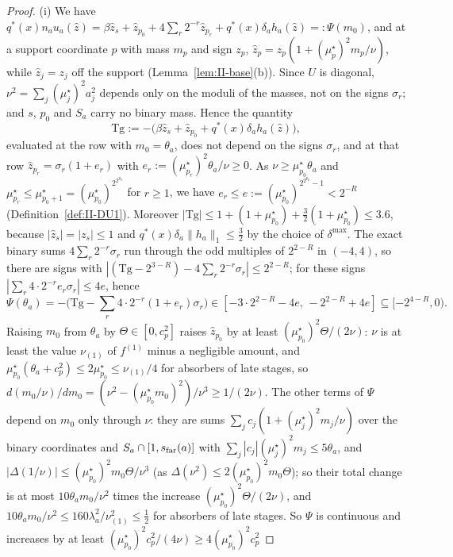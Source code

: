 \documentclass[10pt]{amsart}
\theoremstyle{definition}
\theoremstyle{remark}
\newcommand{\zh}{\hat z}
\begin{document}
\begin{proof}
(i) We have $q^*(x)n_au_a(\zh)=\beta\zh_s+\zh_{p_0}+4\sum_r2^{-r}\zh_{p_r}+q^*(x)
\delta_ah_a(\zh)=:\Psi(m_0)$, and at a support coordinate $p$ with mass $m_p$
and sign $z_p$, $\zh_p=z_p(1+(\mu^\star_p)^2m_p/\nu)$, while $\zh_j=z_j$ off the
support (Lemma~\ref{lem:II-base}(b)).  Since $U$ is diagonal, $\nu^2=\sum_j
(\mu^\star_j)^2a_j^2$ depends only on the moduli of the masses, not on the
signs $\sigma_r$; and $s$, $p_0$ and $S_a$ carry no binary mass.  Hence the
quantity
\[
 \mathrm{Tg}:=-\big(\beta\zh_s+\zh_{p_0}+q^*(x)\delta_ah_a(\zh)\big),
\]
evaluated at the row with $m_0=\theta_a$, does not depend on the signs
$\sigma_r$, and at that row $\zh_{p_r}=\sigma_r(1+e_r)$ with $e_r:=(\mu^\star_{p_r})^2
\theta_a/\nu\ge0$.  As $\nu\ge\mu^\star_{p_0}\theta_a$ and $\mu^\star_{p_r}\le
\mu^\star_{p_0+1}=(\mu^\star_{p_0})^{2^{2^{p_0}}}$ for $r\ge1$, we have $e_r\le e:=
(\mu^\star_{p_0})^{2^{2^{p_0}}-1}<2^{-R}$ (Definition~\ref{def:II-DU1}).  Moreover
$|\mathrm{Tg}|\le1+(1+\mu^\star_{p_0})+\frac32(1+\mu^\star_{p_0})\le3.6$, because
$|\zh_s|=|z_s|\le1$ and $q^*(x)\delta_a\|h_a\|_1\le\frac32$ by the choice of
$\delta^{\max}$.  The exact binary sums $4\sum_r2^{-r}\sigma_r$ run through the
odd multiples of $2^{2-R}$ in $(-4,4)$, so there are signs with $|(\mathrm{Tg}-
2^{3-R})-4\sum_r2^{-r}\sigma_r|\le2^{2-R}$; for these signs
$|\sum_r4\cdot2^{-r}e_r\sigma_r|\le4e$, hence
\[
 \Psi(\theta_a)=-\Big(\mathrm{Tg}-\sum_r4\cdot2^{-r}(1+e_r)\sigma_r\Big)\in
 [-3\cdot2^{2-R}-4e,\,-2^{2-R}+4e]\subseteq[-2^{4-R},0) .
\]
Raising $m_0$ from $\theta_a$ by $\Theta\in[0,c_p^2]$ raises $\zh_{p_0}$ by at
least $(\mu^\star_{p_0})^2\Theta/(2\nu)$: $\nu$ is at least the value $\nu_{(1)}$ of
$f^{(1)}$ minus a negligible amount, and $\mu^\star_{p_0}(\theta_a+c_p^2)\le
2\mu^\star_{p_0}\le\nu_{(1)}/4$ for absorbers of late stages, so $d(m_0/\nu)/dm_0
=(\nu^2-(\mu^\star_{p_0}m_0)^2)/\nu^3\ge1/(2\nu)$.  The other terms of $\Psi$ depend
on $m_0$ only through $\nu$: they are sums $\sum_jc_j(1+(\mu^\star_j)^2m_j/\nu)$
over the binary coordinates and $S_a\cap[1,s_{\rm far}(a)]$ with $\sum_j|c_j|
(\mu^\star_j)^2m_j\le5\theta_a$, and $|\Delta(1/\nu)|\le(\mu^\star_{p_0})^2m_0\Theta/
\nu^3$ (as $\Delta(\nu^2)\le2(\mu^\star_{p_0})^2m_0\Theta$); so their total change is
at most $10\theta_am_0/\nu^2$ times the increase $(\mu^\star_{p_0})^2\Theta/(2\nu)$,
and $10\theta_am_0/\nu^2\le160\lambda_a^2/\nu_{(1)}^2\le\frac12$ for absorbers of
late stages.  So $\Psi$ is continuous and
increases by at least $(\mu^\star_{p_0})^2c_p^2/(4\nu)\ge4(\mu^\star_{p_0})^2c_p^2$

\end{proof}
\end{document}
